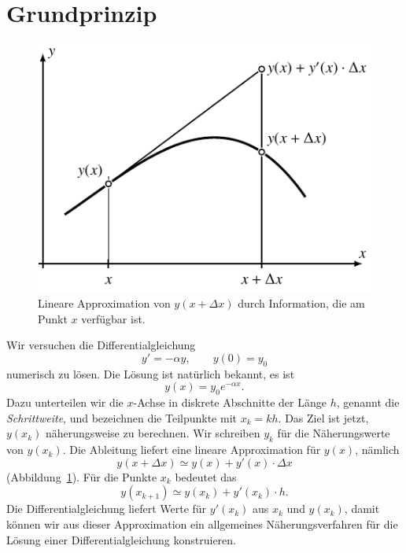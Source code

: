 %
%
%
\section{Grundprinzip}
\begin{figure}
\centering
\includegraphics{chapters/50-ode/figures/prinzip.pdf}
\caption{Lineare Approximation von $y(x+\Delta x)$ durch Information,
die am Punkt $x$ verfügbar ist.
\label{buch:ode:lineareapproximation}}
\end{figure}
Wir versuchen die Differentialgleichung
\begin{equation}
y'=-\alpha y,\qquad y(0)=y_0
\label{buch:ode:expdgl}
\end{equation}
numerisch zu lösen. 
Die Lösung ist natürlich bekannt, es ist 
\begin{equation}
y(x)=y_0e^{-\alpha x}.
\label{buch:ode:beispiel-loesung}
\end{equation}
Dazu unterteilen wir die $x$-Achse in diskrete Abschnitte der Länge $h$,
genannt die {\em Schrittweite},
%
und bezeichnen die Teilpunkte mit $x_k=kh$.
Das Ziel ist jetzt, $y(x_k)$ näherungsweise zu berechnen.
Wir schreiben $y_k$ für die Näherungswerte von $y(x_k)$.
Die Ableitung liefert eine lineare Approximation für $y(x)$,
nämlich
\[
y(x+\Delta x)\simeq y(x) + y'(x)\cdot\Delta x
\]
(Abbildung~\ref{buch:ode:lineareapproximation}).
Für die Punkte $x_k$ bedeutet das
\[
y(x_{k+1})\simeq y(x_{k})+y'(x_k)\cdot h.
\]
Die Differentialgleichung liefert Werte für $y'(x_k)$ aus $x_k$ und $y(x_k)$,
damit können wir aus dieser Approximation ein allgemeines
Näherungsverfahren für die Lösung einer Differentialgleichung
konstruieren.

